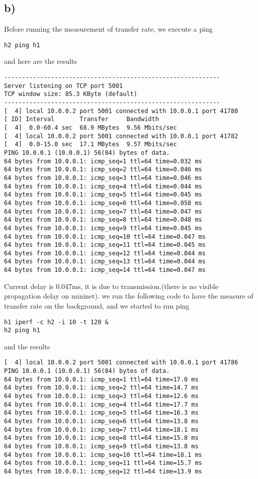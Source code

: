 \documentclass[11pt]{article}
\begin{document}
\subsection{b)}
\label{sec:org750d320}
Before running the measurement of transfer rate, we execute a ping
\begin{verbatim}
h2 ping h1
\end{verbatim}
and here are the results
\begin{verbatim}
------------------------------------------------------------
Server listening on TCP port 5001
TCP window size: 85.3 KByte (default)
------------------------------------------------------------
[  4] local 10.0.0.2 port 5001 connected with 10.0.0.1 port 41780
[ ID] Interval       Transfer     Bandwidth
[  4]  0.0-60.4 sec  68.9 MBytes  9.56 Mbits/sec
[  4] local 10.0.0.2 port 5001 connected with 10.0.0.1 port 41782
[  4]  0.0-15.0 sec  17.1 MBytes  9.57 Mbits/sec
PING 10.0.0.1 (10.0.0.1) 56(84) bytes of data.
64 bytes from 10.0.0.1: icmp_seq=1 ttl=64 time=0.032 ms
64 bytes from 10.0.0.1: icmp_seq=2 ttl=64 time=0.046 ms
64 bytes from 10.0.0.1: icmp_seq=3 ttl=64 time=0.046 ms
64 bytes from 10.0.0.1: icmp_seq=4 ttl=64 time=0.044 ms
64 bytes from 10.0.0.1: icmp_seq=5 ttl=64 time=0.045 ms
64 bytes from 10.0.0.1: icmp_seq=6 ttl=64 time=0.058 ms
64 bytes from 10.0.0.1: icmp_seq=7 ttl=64 time=0.047 ms
64 bytes from 10.0.0.1: icmp_seq=8 ttl=64 time=0.048 ms
64 bytes from 10.0.0.1: icmp_seq=9 ttl=64 time=0.045 ms
64 bytes from 10.0.0.1: icmp_seq=10 ttl=64 time=0.047 ms
64 bytes from 10.0.0.1: icmp_seq=11 ttl=64 time=0.045 ms
64 bytes from 10.0.0.1: icmp_seq=12 ttl=64 time=0.044 ms
64 bytes from 10.0.0.1: icmp_seq=13 ttl=64 time=0.044 ms
64 bytes from 10.0.0.1: icmp_seq=14 ttl=64 time=0.047 ms
\end{verbatim}
Current delay is 0.047ms, it is due to transmission.(there is no visible propagation delay
on mininet).
we run the following code to have the measure of transfer rate on the background,
and we started to run ping
\begin{verbatim}
h1 iperf -c h2 -i 10 -t 120 &
h2 ping h1
\end{verbatim}
and the results
\begin{verbatim}
[  4] local 10.0.0.2 port 5001 connected with 10.0.0.1 port 41786
PING 10.0.0.1 (10.0.0.1) 56(84) bytes of data.
64 bytes from 10.0.0.1: icmp_seq=1 ttl=64 time=17.0 ms
64 bytes from 10.0.0.1: icmp_seq=2 ttl=64 time=14.7 ms
64 bytes from 10.0.0.1: icmp_seq=3 ttl=64 time=12.6 ms
64 bytes from 10.0.0.1: icmp_seq=4 ttl=64 time=17.7 ms
64 bytes from 10.0.0.1: icmp_seq=5 ttl=64 time=16.3 ms
64 bytes from 10.0.0.1: icmp_seq=6 ttl=64 time=13.8 ms
64 bytes from 10.0.0.1: icmp_seq=7 ttl=64 time=18.1 ms
64 bytes from 10.0.0.1: icmp_seq=8 ttl=64 time=15.8 ms
64 bytes from 10.0.0.1: icmp_seq=9 ttl=64 time=13.8 ms
64 bytes from 10.0.0.1: icmp_seq=10 ttl=64 time=18.1 ms
64 bytes from 10.0.0.1: icmp_seq=11 ttl=64 time=15.7 ms
64 bytes from 10.0.0.1: icmp_seq=12 ttl=64 time=13.9 ms
\end{verbatim}
\end{document}
